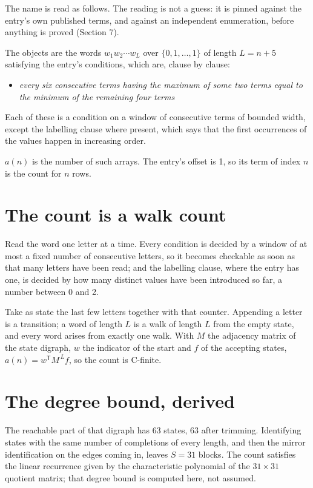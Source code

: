 \documentclass[11pt]{article}
\theoremstyle{definition}
\begin{document}
The name is read as follows. The reading is not a guess: it is pinned against the entry's own published terms, and against an independent enumeration, before anything is proved (Section 7).

The objects are the words $w_1 w_2 \cdots w_L$ over $\{0,1,\dots,1\}$ of length $L = n + 5$ satisfying the entry's conditions, which are, clause by clause:

\begin{itemize}

\item {\itshape every six consecutive terms having the maximum of some two terms equal to the minimum of the remaining four terms}

\end{itemize}

Each of these is a condition on a window of consecutive terms of bounded width, except the labelling clause where present, which says that the first occurrences of the values happen in increasing order.

$a(n)$ is the number of such arrays. The entry's offset is 1, so its term of index $n$ is the count for $n$ rows.

\section{The count is a walk count}

Read the word one letter at a time. Every condition is decided by a window of at most a fixed number of consecutive letters, so it becomes checkable as soon as that many letters have been read; and the labelling clause, where the entry has one, is decided by how many distinct values have been introduced so far, a number between $0$ and 2.

Take as state the last few letters together with that counter. Appending a letter is a transition; a word of length $L$ is a walk of length $L$ from the empty state, and every word arises from exactly one walk. With $M$ the adjacency matrix of the state digraph, $w$ the indicator of the start and $f$ of the accepting states, $a(n) = w^{\mathsf T}M^{\,L}f$, so the count is C-finite.

\section{The degree bound, derived}

The reachable part of that digraph has $63$ states, $63$ after trimming. Identifying states with the same number of completions of every length, and then the mirror identification on the edges coming in, leaves $S = 31$ blocks. The count satisfies the linear recurrence given by the characteristic polynomial of the $31\times31$ quotient matrix; that degree bound is computed here, not assumed.
\end{document}
